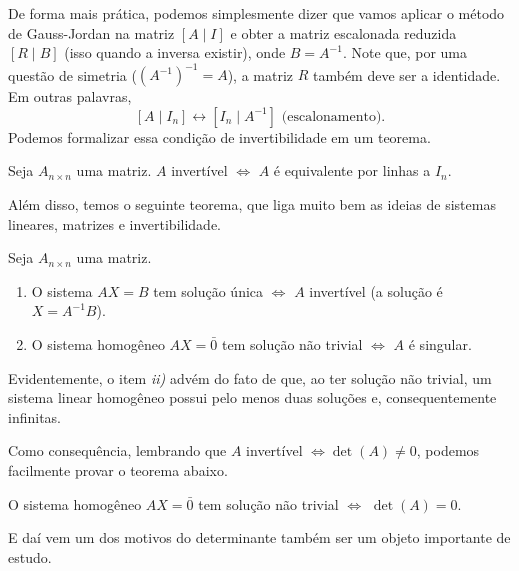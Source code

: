 \documentclass[../main.tex]{subfiles}
\begin{document}
			De forma mais prática, podemos simplesmente dizer que vamos aplicar o método de Gauss-Jordan na matriz $[A\mid I]$ e obter a matriz escalonada reduzida $[R\mid B]$ (isso quando a inversa existir), onde $B=A^{-1}$. Note que, por uma questão de simetria ($(A^{-1})^{-1}=A$), a matriz $R$ também deve ser a identidade. Em outras palavras,
			\[
			[A\mid I_n]\longleftrightarrow [I_n \mid A^{-1}] \text{ (escalonamento).}
			\]
			Podemos formalizar essa condição de invertibilidade em um teorema.
			\begin{teorema}
				Seja $A_{n\times n}$ uma matriz. $A$ invertível $\Leftrightarrow$ $A$ é equivalente por linhas a $I_n$.
			\end{teorema}
			Além disso, temos o seguinte teorema, que liga muito bem as ideias de sistemas lineares, matrizes e invertibilidade.
			\begin{teorema}
				Seja $A_{n\times n}$ uma matriz.
				\begin{enumerate}[label=\roman*)]
					\item O sistema $AX=B$ tem solução única $\Leftrightarrow$ $A$ invertível (a solução é $X=A^{-1}B$).
					\item O sistema homogêneo $AX=\bar{0}$ tem solução não trivial $\Leftrightarrow$ $A$ é singular.
				\end{enumerate}
			\end{teorema}
			Evidentemente, o item \textit{ii)} advém do fato de que, ao ter solução não trivial, um sistema linear homogêneo possui pelo menos duas soluções e, consequentemente infinitas.
				
			Como consequência, lembrando que $A$ invertível $\Leftrightarrow \det(A)\neq 0$, podemos facilmente provar o teorema abaixo.
			\begin{teorema}
				O sistema homogêneo $AX=\bar{0}$ tem solução não trivial $\Leftrightarrow$ $\det(A)= 0$.
			\end{teorema}
			E daí vem um dos motivos do determinante também ser um objeto importante de estudo.
			
\end{document}
